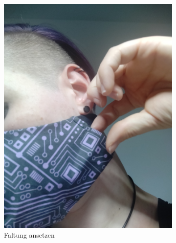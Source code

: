 \documentclass[12pt,parskip=full]{scrartcl}
\begin{document}
\begin{figure}[hp]
    \vspace{0.5cm}
    \centering
    \begin{subfigure}{0.48\textwidth}
        \centering
        \includegraphics[width = \linewidth]{Pictures/11_Folding/Folding1_resized.jpg}
        \caption{Faltung ansetzen}
        \label{Folding1}
    \end{subfigure}
    \begin{subfigure}{0.48\textwidth}
        \centering

\end{subfigure}
\end{figure}
\end{document}
